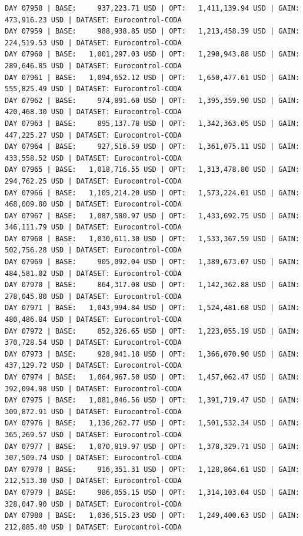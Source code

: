 \documentclass[11pt,a4paper]{article}
\begin{document}
\begin{verbatim}
DAY 07958 | BASE:     937,223.71 USD | OPT:   1,411,139.94 USD | GAIN: 473,916.23 USD | DATASET: Eurocontrol-CODA
DAY 07959 | BASE:     988,938.85 USD | OPT:   1,213,458.39 USD | GAIN: 224,519.53 USD | DATASET: Eurocontrol-CODA
DAY 07960 | BASE:   1,001,297.03 USD | OPT:   1,290,943.88 USD | GAIN: 289,646.85 USD | DATASET: Eurocontrol-CODA
DAY 07961 | BASE:   1,094,652.12 USD | OPT:   1,650,477.61 USD | GAIN: 555,825.49 USD | DATASET: Eurocontrol-CODA
DAY 07962 | BASE:     974,891.60 USD | OPT:   1,395,359.90 USD | GAIN: 420,468.30 USD | DATASET: Eurocontrol-CODA
DAY 07963 | BASE:     895,137.78 USD | OPT:   1,342,363.05 USD | GAIN: 447,225.27 USD | DATASET: Eurocontrol-CODA
DAY 07964 | BASE:     927,516.59 USD | OPT:   1,361,075.11 USD | GAIN: 433,558.52 USD | DATASET: Eurocontrol-CODA
DAY 07965 | BASE:   1,018,716.55 USD | OPT:   1,313,478.80 USD | GAIN: 294,762.25 USD | DATASET: Eurocontrol-CODA
DAY 07966 | BASE:   1,105,214.20 USD | OPT:   1,573,224.01 USD | GAIN: 468,009.80 USD | DATASET: Eurocontrol-CODA
DAY 07967 | BASE:   1,087,580.97 USD | OPT:   1,433,692.75 USD | GAIN: 346,111.79 USD | DATASET: Eurocontrol-CODA
DAY 07968 | BASE:   1,030,611.30 USD | OPT:   1,533,367.59 USD | GAIN: 502,756.28 USD | DATASET: Eurocontrol-CODA
DAY 07969 | BASE:     905,092.04 USD | OPT:   1,389,673.07 USD | GAIN: 484,581.02 USD | DATASET: Eurocontrol-CODA
DAY 07970 | BASE:     864,317.08 USD | OPT:   1,142,362.88 USD | GAIN: 278,045.80 USD | DATASET: Eurocontrol-CODA
DAY 07971 | BASE:   1,043,994.84 USD | OPT:   1,524,481.68 USD | GAIN: 480,486.84 USD | DATASET: Eurocontrol-CODA
DAY 07972 | BASE:     852,326.65 USD | OPT:   1,223,055.19 USD | GAIN: 370,728.54 USD | DATASET: Eurocontrol-CODA
DAY 07973 | BASE:     928,941.18 USD | OPT:   1,366,070.90 USD | GAIN: 437,129.72 USD | DATASET: Eurocontrol-CODA
DAY 07974 | BASE:   1,064,967.50 USD | OPT:   1,457,062.47 USD | GAIN: 392,094.98 USD | DATASET: Eurocontrol-CODA
DAY 07975 | BASE:   1,081,846.56 USD | OPT:   1,391,719.47 USD | GAIN: 309,872.91 USD | DATASET: Eurocontrol-CODA
DAY 07976 | BASE:   1,136,262.77 USD | OPT:   1,501,532.34 USD | GAIN: 365,269.57 USD | DATASET: Eurocontrol-CODA
DAY 07977 | BASE:   1,070,819.97 USD | OPT:   1,378,329.71 USD | GAIN: 307,509.74 USD | DATASET: Eurocontrol-CODA
DAY 07978 | BASE:     916,351.31 USD | OPT:   1,128,864.61 USD | GAIN: 212,513.30 USD | DATASET: Eurocontrol-CODA
DAY 07979 | BASE:     986,055.15 USD | OPT:   1,314,103.04 USD | GAIN: 328,047.90 USD | DATASET: Eurocontrol-CODA
DAY 07980 | BASE:   1,036,515.23 USD | OPT:   1,249,400.63 USD | GAIN: 212,885.40 USD | DATASET: Eurocontrol-CODA

\end{verbatim}
\end{document}
